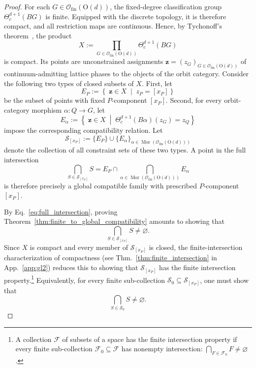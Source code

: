 \documentclass[aps,prx,reprint,superscriptaddress,twocolumn,amsmath,amssymb,amsfonts, nofootinbib]{revtex4-2}
\newcommand{\ofin}{\mathcal{O}_{\text{fin}}}
\theoremstyle{apsstyle}
\begin{document}
\begin{proof}
For each $G\in\ofin(\mathrm{O}(d))$, the fixed-degree classification group $\Theta^{d+1}_{c}(BG)$ is finite. Equipped with the discrete topology, it is therefore compact, and all restriction maps are continuous. Hence, by Tychonoff's theorem~\cite[\href{https://stacks.math.columbia.edu/tag/08ZU}{Tag
08ZU}]{stacks-project}, the product
\begin{equation*}
X:= \prod_{G\in\ofin(\mathrm{O}(d))} \Theta^{d+1}_{c}(BG)
\end{equation*}
is compact. Its points are unconstrained assignments $\mathbf z=(z_G)_{G\in\ofin(\mathrm{O}(d))}$ of continuum-admitting lattice phases to the objects of the orbit category. Consider the following two types of closed subsets of $X$. First, let
\begin{equation*}
E_P:= \left\{\; \mathbf z\in X\;\middle|\;z_P=[x_P] \right\}
\end{equation*}
be the subset of points with fixed $P$-component $[x_{P}]$. Second, for every orbit-category morphism $\alpha:Q\to G$, let
\begin{equation*}
E_{\alpha}:= \left\{\; \mathbf z\in X\;\middle|\; \Theta^{d+1}_{c}(B\alpha)(z_G)=z_Q \right\}
\end{equation*}
impose the corresponding compatibility relation. Let 
\begin{equation}
    \mathcal{S}_{[x_{P}]}:=\{ E_{P} \} \cup \{E_{\alpha}\}_{\alpha\in\operatorname{Mor}(\ofin(\mathrm{O}(d)))}
\end{equation}
denote the collection of all constraint sets of these two types. A point in the full intersection
\begin{equation}
\bigcap_{S\in \mathcal{S}_{[x_{P}]}} S=E_P\cap \bigcap_{\alpha\in\operatorname{Mor}(\ofin(\mathrm{O}(d)))} E_{\alpha}
\label{eq:full_intersection}
\end{equation}
is therefore precisely a global compatible family with prescribed $P$-component $[x_P]$. 

\bigskip 

By Eq.~\eqref{eq:full_intersection}, proving Theorem~\ref{thm:finite_to_global_compatibility} amounts to showing that
\begin{equation*}
\bigcap_{S\in\mathcal S_{[x_P]}}S \neq \varnothing.
\end{equation*}
Since $X$ is compact and every member of $\mathcal S_{[x_P]}$ is closed, the finite-intersection characterization of compactness (see Thm.~\ref{thm:finite_intersection} in App.~\ref{app:gl2}) reduces this to showing that $\mathcal S_{[x_P]}$ has the finite intersection property.\footnote{A collection $\mathcal F$ of subsets of a space has the
finite intersection property if every finite sub-collection
$\mathcal F_0\subseteq\mathcal F$ has nonempty intersection:
$\bigcap_{F\in\mathcal F_0}F\neq\varnothing$.} Equivalently, for every finite sub-collection $\mathcal S_0\subseteq\mathcal S_{[x_P]}$, one must show that
\begin{equation*}
\bigcap_{S\in\mathcal S_0} S \neq \varnothing.
\end{equation*}


\end{proof}
\end{document}
